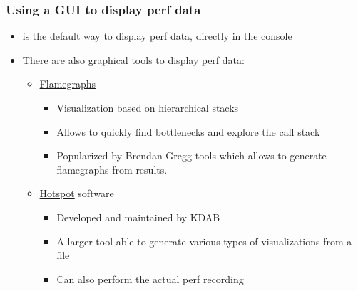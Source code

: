 \begin{frame}[fragile]
  \frametitle{Using a GUI to display perf data}
  \begin{itemize}
    \item {} is the default way to display perf data,
      directly in the console
    \item There are also graphical tools to display perf data:
      \begin{itemize}
        \item
          \href{http://www.brendangregg.com/flamegraphs.html}{Flamegraphs}
          \begin{itemize}
            \item Visualization based on hierarchical stacks
            \item Allows to quickly find bottlenecks and explore the call stack
            \item Popularized by Brendan Gregg tools which allows to generate
              flamegraphs from  results.
          \end{itemize}
        \item \href{https://github.com/KDAB/hotspot}{Hotspot} software
          \begin{itemize}
            \item Developed and maintained by KDAB
            \item A larger tool able to generate various types of
              visualizations from a  file
            \item Can also perform the actual perf recording
          \end{itemize}
      \end{itemize}
  \end{itemize}
\end{frame} 

